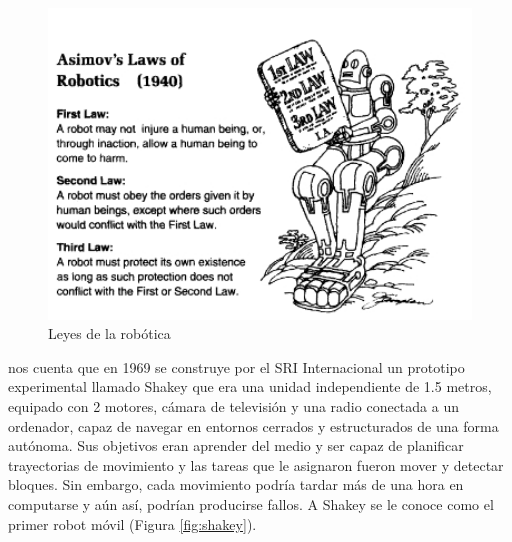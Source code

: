 \begin{figure} [h!]
	\begin{center}
		\includegraphics[width=12cm]{figs/issac-law.png}
	\end{center}
	\caption{ Leyes de la robótica} %
\label{fig:Asimov}
\end{figure}


\cite{nilsson1984shakey} nos cuenta que en 1969 se construye por el \ac{SRI} Internacional un prototipo experimental llamado Shakey que era una unidad independiente de 1.5 metros, equipado con 2 motores, cámara de televisión y una radio conectada a un ordenador, capaz de navegar en entornos cerrados y estructurados de una forma autónoma. Sus objetivos eran aprender del medio y ser capaz de planificar trayectorias de movimiento y las tareas que le asignaron fueron mover y detectar bloques. Sin embargo, cada movimiento podría tardar más de una hora en computarse y aún así, podrían producirse fallos. A Shakey se le conoce como el primer robot móvil (Figura \ref{fig:shakey}). \\

